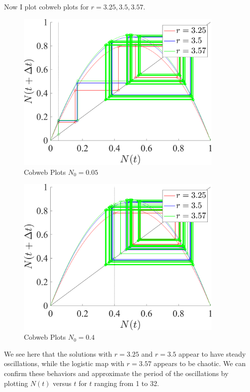 \documentclass[11pt]{article}
\begin{document}
Now I plot cobweb plots for $r = 3.25, 3.5, 3.57$.

\begin{figure}[h]
\centering
\includegraphics[width=10cm]{8_p2_3_2_r0_05}
\caption{Cobweb Plots $N_0 = 0.05$}
\end{figure}


\begin{figure}[H]
\centering
\includegraphics[width=10cm]{8_p2_3_2_r0_4}
\caption{Cobweb Plots $N_0 = 0.4$}
\end{figure}

We see here that the solutions with $r = 3.25$ and $r = 3.5$ appear to have steady oscillations, while the logistic map with $r = 3.57$ appears to be chaotic. We can confirm these behaviors and approximate the period of the oscillations by plotting $N(t)$ versus $t$ for $t$ ranging from 1 to 32.
\end{document}
